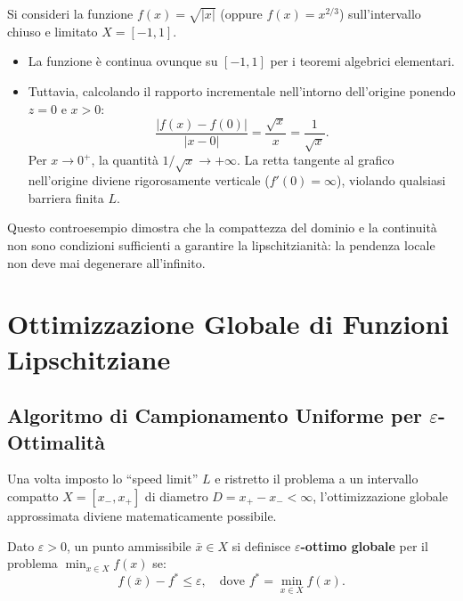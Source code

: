 \begin{example}
Si consideri la funzione $f(x) = \sqrt{|x|}$ (oppure $f(x) = x^{2/3}$) sull'intervallo chiuso e limitato $X = [-1, 1]$.
\begin{itemize}
    \item La funzione \`e continua ovunque su $[-1, 1]$ per i teoremi algebrici elementari.
    \item Tuttavia, calcolando il rapporto incrementale nell'intorno dell'origine ponendo $z = 0$ e $x > 0$:
    \begin{equation}
        \frac{|f(x) - f(0)|}{|x - 0|} = \frac{\sqrt{x}}{x} = \frac{1}{\sqrt{x}}.
    \end{equation}
    Per $x \to 0^+$, la quantit\`a $1/\sqrt{x} \to +\infty$. La retta tangente al grafico nell'origine diviene rigorosamente verticale ($f'(0) = \infty$), violando qualsiasi barriera finita $L$.
\end{itemize}
Questo controesempio dimostra che la compattezza del dominio e la continuit\`a non sono condizioni sufficienti a garantire la lipschitzianit\`a: la pendenza locale non deve mai degenerare all'infinito.
\end{example}

\FloatBarrier
\section{Ottimizzazione Globale di Funzioni Lipschitziane}
\label{sec:univariata-ottimizzazione-globale-lipschitz}

\subsection{Algoritmo di Campionamento Uniforme per $\varepsilon$-Ottimalit\`a}
Una volta imposto lo ``speed limit'' $L$ e ristretto il problema a un intervallo compatto $X = [x_-, x_+]$ di diametro $D = x_+ - x_- < \infty$, l'ottimizzazione globale approssimata diviene matematicamente possibile.

\begin{definition}
Dato $\varepsilon > 0$, un punto ammissibile $\bar{x} \in X$ si definisce \textbf{$\varepsilon$-ottimo globale} per il problema $\min_{x \in X} f(x)$ se:
\begin{equation}
    f(\bar{x}) - f^* \le \varepsilon, \quad \text{dove } f^* = \min_{x \in X} f(x).
\end{equation}
\end{definition}

